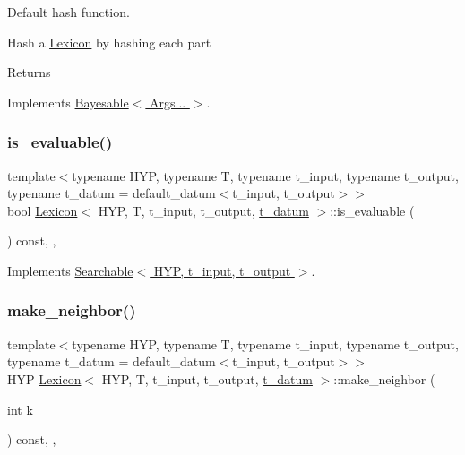 Default hash function. 

Hash a \hyperlink{class_lexicon}{Lexicon} by hashing each part \begin{DoxyReturn}{Returns}

\end{DoxyReturn}


Implements \hyperlink{class_bayesable_ab77a023d33951448e6edb2e1bc79c5ae}{Bayesable$<$ Args... $>$}.

\mbox{\label{class_lexicon_a4928f2db73eb7d675f347429a4167820}} 
\subsubsection{\texorpdfstring{is\+\_\+evaluable()}{is\_evaluable()}}
{\footnotesize\ttfamily template$<$typename H\+YP, typename T, typename t\+\_\+input, typename t\+\_\+output, typename t\+\_\+datum = default\+\_\+datum$<$t\+\_\+input, t\+\_\+output$>$$>$ \\
bool \hyperlink{class_lexicon}{Lexicon}$<$ H\+YP, T, t\+\_\+input, t\+\_\+output, \hyperlink{class_bayesable_a7c93a2eeab708378eb321745908718d4}{t\+\_\+datum} $>$\+::is\+\_\+evaluable (\begin{DoxyParamCaption}{ }\end{DoxyParamCaption}) const\hspace{0.3cm}{\ttfamily [inline]}, {\ttfamily [override]}, {\ttfamily [virtual]}}



Implements \hyperlink{class_searchable_aae16f1cb01f140f4033f6f67dc9753b6}{Searchable$<$ H\+Y\+P, t\+\_\+input, t\+\_\+output $>$}.

\mbox{\label{class_lexicon_a3d4fb7e4545267221eb38acba4d52a6b}} 
\subsubsection{\texorpdfstring{make\+\_\+neighbor()}{make\_neighbor()}}
{\footnotesize\ttfamily template$<$typename H\+YP, typename T, typename t\+\_\+input, typename t\+\_\+output, typename t\+\_\+datum = default\+\_\+datum$<$t\+\_\+input, t\+\_\+output$>$$>$ \\
H\+YP \hyperlink{class_lexicon}{Lexicon}$<$ H\+YP, T, t\+\_\+input, t\+\_\+output, \hyperlink{class_bayesable_a7c93a2eeab708378eb321745908718d4}{t\+\_\+datum} $>$\+::make\+\_\+neighbor (\begin{DoxyParamCaption}\item[{int}]{k }\end{DoxyParamCaption}) const\hspace{0.3cm}{\ttfamily [inline]}, {\ttfamily [override]}, {\ttfamily [virtual]}}



